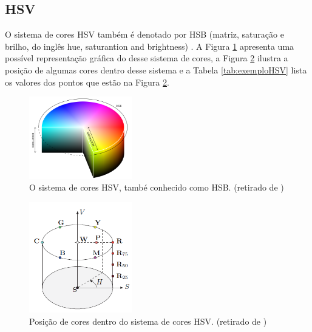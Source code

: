 \documentclass[	12pt, Times, openright, twoside, a4paper, english, brazil]{abntex2}
\begin{document}
\subsection{HSV}

O sistema de cores HSV também é denotado por HSB (matriz, saturação e brilho, do inglês hue, saturantion and brightness) \cite{burger2009digital}. A Figura \ref{fig:figuraHSV} apresenta uma possível representação gráfica do desse sistema de cores, a Figura \ref{fig:figuraHSV2} ilustra a posição de algumas cores dentro desse sistema e a Tabela \ref{tab:exemploHSV} lista os valores dos pontos que estão na Figura \ref{fig:figuraHSV2}.

\begin{figure}[!htb]
\centering \includegraphics[width=0.4\textwidth]{figuraHSV.png}
\caption{O sistema de cores HSV, també conhecido como HSB. (retirado de ) \label{fig:figuraHSV}}
\end{figure}

\begin{figure}[!htb]
\centering \includegraphics[width=0.4\textwidth]{figuraHSV2.png}
\caption{Posição de cores dentro do sistema de cores HSV. (retirado de ) \label{fig:figuraHSV2}}
\end{figure}
\end{document}
